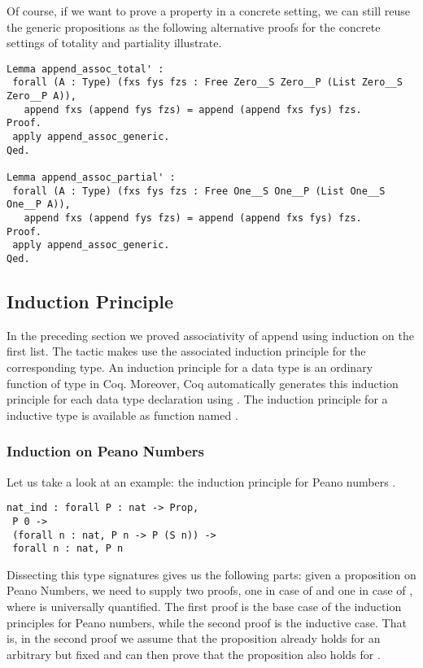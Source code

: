 Of course, if we want to prove a property in a concrete setting, we can still reuse the generic propositions as the following alternative proofs for the concrete settings of totality and partiality illustrate.

\begin{verbatim}
Lemma append_assoc_total' :
 forall (A : Type) (fxs fys fzs : Free Zero__S Zero__P (List Zero__S Zero__P A)),
   append fxs (append fys fzs) = append (append fxs fys) fzs.
Proof.
 apply append_assoc_generic.
Qed.

Lemma append_assoc_partial' :
 forall (A : Type) (fxs fys fzs : Free One__S One__P (List One__S One__P A)),
   append fxs (append fys fzs) = append (append fxs fys) fzs.
Proof.
 apply append_assoc_generic.
Qed.
\end{verbatim}

\subsection{Induction Principle}

In the preceding section we proved associativity of append using induction on the first list.
The  tactic makes use the associated induction principle for the corresponding type.
An induction principle for a data type is an ordinary function of type  in Coq.
Moreover, Coq automatically generates this induction principle for each data type declaration using .
The induction principle for a inductive type  is available as function named .

\subsubsection{Induction on Peano Numbers}
Let us take a look at an example: the induction principle for Peano numbers .

\begin{verbatim}
nat_ind : forall P : nat -> Prop,
 P 0 ->
 (forall n : nat, P n -> P (S n)) ->
 forall n : nat, P n
\end{verbatim}

Dissecting this type signatures gives us the following parts: given a proposition  on Peano Numbers, we need to supply two proofs, one in case of  and one in case of , where  is universally quantified.
The first proof is the base case of the induction principles for Peano numbers, while the second proof is the inductive case.
That is, in the second proof we assume that the proposition already holds for an arbitrary but fixed  and can then prove that the proposition also holds for .

